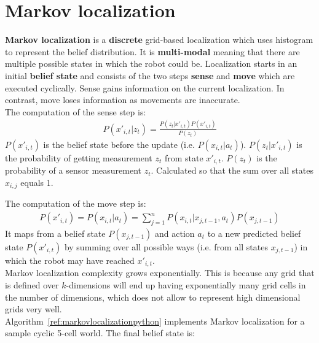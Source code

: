 \documentclass{report}
\begin{document}
\section{Markov localization}
{\bf Markov localization} is a {\bf discrete} grid-based localization which uses histogram to represent the belief distribution. It is {\bf multi-modal} meaning that there are multiple possible states in which the robot could be. Localization starts in an initial {\bf belief state} and consists of the two steps {\bf sense} and {\bf move} which are executed cyclically. Sense gains information on the current localization. In contrast, move loses information as movements are inaccurate. \\
The computation of the sense step is: \\
\begin{align*}
P(x'_{i,t}\vert z_t) = \frac{P(z_t\vert x'_{i,t})P(x'_{i,t})}{P(z_t)}
\end{align*}
$P(x'_{i,t})$ is the belief state before the update (i.e. $P(x_{i,t}\vert a_t)$). $P(z_t\vert x'_{i,t})$ is the probability of getting measurement $z_t$ from state $x'_{i,t}$. $P(z_t)$ is the probability of a sensor measurement $z_t$. Calculated so that the sum over all states $x_{i,j}$ equals 1.

The computation of the move step is:
\begin{align*}
P(x'_{i,t}) = P(x_{i,t}\vert a_t) = \sum_{j=1}^{n} P(x_{i,t}\vert x_{j,t-1},a_t)P(x_{j,t-1})
\end{align*}
It maps from a belief state $P(x_{j,t-1})$ and action $a_t$ to a new predicted belief state $P(x'_{i,t})$ by
summing over all possible ways (i.e. from all states $x_{j,t-1}$) in which the robot may have reached $x'_{i,t}$. \\
Markov localization complexity grows exponentially. This is because any grid that is defined over $k$-dimensions will end up having exponentially many grid cells in the number of dimensions, which does not allow to represent high dimensional grids very well. \\
Algorithm~\ref{ref:markovlocalizationpython} implements Markov localization for a sample cyclic 5-cell world. The final belief state is:
\begin{align*}
[0.0789, 0.0753, 0.2247, {\bf 0.4329}, 0.1882]
\end{align*}
\end{document}
